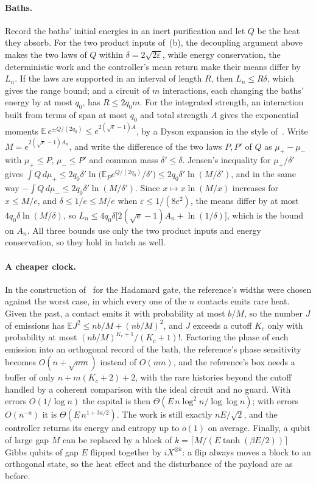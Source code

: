 \documentclass[11pt]{article}
\theoremstyle{definition}
\theoremstyle{remark}
\begin{document}
\paragraph{Baths.} Record the baths' initial energies in an inert purification and let $Q$ be the heat they absorb. For the two product inputs of~(b), the decoupling argument above makes the two laws of $Q$ within $\delta=2\sqrt{2\varepsilon}$, while energy conservation, the deterministic work and the controller's mean return make their means differ by $L_n$. If the laws are supported in an interval of length $R$, then $L_n\le R\delta$, which gives the range bound; and a circuit of $m$ interactions, each changing the baths' energy by at most $q_0$, has $R\le2q_0m$. For the integrated strength, an interaction built from terms of span at most $q_0$ and total strength $A$ gives the exponential moments $\mathbb E\,e^{\pm Q/(2q_0)}\le e^{2(\sqrt e-1)A}$, by a Dyson expansion in the style of~\cite{AKL16}. Write $M=e^{2(\sqrt e-1)A_n}$, and write the difference of the two laws $P,P'$ of $Q$ as $\mu_+-\mu_-$ with $\mu_+\le P$, $\mu_-\le P'$ and common mass $\delta'\le\delta$. Jensen's inequality for $\mu_+/\delta'$ gives $\int Q\,d\mu_+\le2q_0\delta'\ln\bigl(\mathbb E_Pe^{Q/(2q_0)}/\delta'\bigr)\le2q_0\delta'\ln(M/\delta')$, and in the same way $-\int Q\,d\mu_-\le2q_0\delta'\ln(M/\delta')$. Since $x\mapsto x\ln(M/x)$ increases for $x\le M/e$, and $\delta\le1/e\le M/e$ when $\varepsilon\le1/(8e^2)$, the means differ by at most $4q_0\delta\ln(M/\delta)$, so $L_n\le4q_0\delta\bigl[2(\sqrt e-1)A_n+\ln(1/\delta)\bigr]$, which is the bound on $A_n$. All three bounds use only the two product inputs and energy conservation, so they hold in batch as well.

\paragraph{A cheaper clock.} In the construction of~\cite{SaveWork} for the Hadamard gate, the reference's widths were chosen against the worst case, in which every one of the $n$ contacts emits rare heat. Given the past, a contact emits it with probability at most $b/M$, so the number $J$ of emissions has $\mathbb EJ^2\le nb/M+(nb/M)^2$, and $J$ exceeds a cutoff $K_c$ only with probability at most $(nb/M)^{K_c+1}/(K_c+1)!$. Factoring the phase of each emission into an orthogonal record of the bath, the reference's phase sensitivity becomes $O(n+\sqrt{nm})$ instead of $O(nm)$, and the reference's box needs a buffer of only $n+m(K_c+2)+2$, with the rare histories beyond the cutoff handled by a coherent comparison with the ideal circuit and no guard. With errors $O(1/\log n)$ the capital is then $\Theta(E\,n\log^2n/\log\log n)$; with errors $O(n^{-a})$ it is $\Theta(E\,n^{1+3a/2})$. The work is still exactly $nE/\sqrt2$, and the controller returns its energy and entropy up to $o(1)$ on average. Finally, a qubit of large gap $M$ can be replaced by a block of $k=\lceil M/(E\tanh(\beta E/2))\rceil$ Gibbs qubits of gap $E$ flipped together by $iX^{\otimes k}$: a flip always moves a block to an orthogonal state, so the heat effect and the disturbance of the payload are as before.
\end{document}
